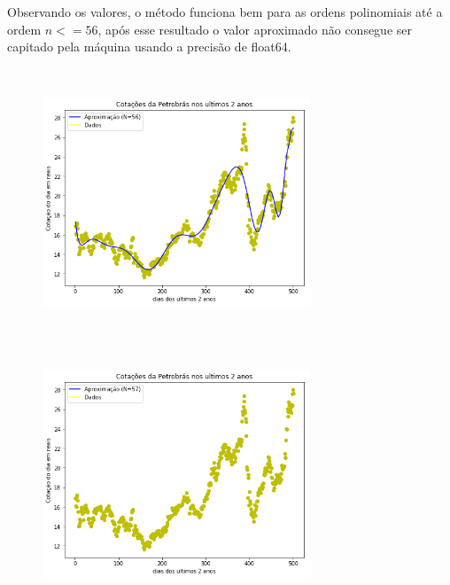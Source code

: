 \documentclass{article}
\begin{document}
\newpage

Observando os valores, o método funciona bem para as ordens polinomiais até a ordem $n <= 56$, após esse resultado o valor aproximado não consegue ser capitado pela máquina usando a precisão de float64.

\begin{figure}[!htb]
\includegraphics [width=8cm,height=8cm]{G56.png}
\includegraphics [width=8cm,height=8cm]{G57.png}
\end{figure}
\end{document}
